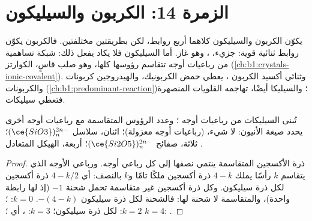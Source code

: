 \section{الزمرة 14: الكربون والسيليكون}

يكوّن الكربون والسيليكون كلاهما أربع روابط، لكن بطريقتين مختلفتين. فالكربون يكوّن
روابط ثنائية قوية:  جزيء، ، وهو غاز. أما السيليكون
فلا يكاد يفعل ذلك:  شبكة تساهمية من رباعيات أوجه 
تتقاسم رؤوسها كلها، وهو صلب قاسٍ، الكوارتز (\cref{ch:b1:crystals-ionic-covalent}).
وثنائي أكسيد الكربون ، يعطي حمض الكربونيك، والهيدروجين كربونات
والكربونات (\cref{ch:b1:predominant-reaction})؛ والسيليكا  أيضًا، تهاجمه القلويات المنصهرة فتعطي سيليكات.

\begin{proposition}\label{prop:b1:p-block-13-15:silicate-units}
تُبنى السيليكات من رباعيات أوجه ؛ وعدد الرؤوس المتقاسمة
مع رباعيات أوجه أخرى يحدد صيغة الأنيون: لا شيء، 
(رباعيات أوجه معزولة)؛ اثنان، سلاسل $(\ce{SiO3})_n^{2n-}$؛ ثلاثة، صفائح
$(\ce{Si2O5})_n^{2n-}$؛ أربعة، الهيكل المتعادل .
\end{proposition}

\begin{proof}
ذرة الأكسجين المتقاسمة ينتمي نصفها إلى كل رباعي أوجه. ورباعي الأوجه الذي يتقاسم
$k$ رأسًا يملك $4 - k$ ذرة أكسجين ملكًا تامًا و$k$ بالنصف: أي $4 -
k/2$ ذرة أكسجين لكل ذرة سيليكون. وكل ذرة أكسجين غير متقاسمة تحمل شحنة $-1$ (إذ
لها رابطة واحدة)، والمتقاسمة لا شحنة لها: فالشحنة لكل ذرة سيليكون
$-(4 - k)$. $k = 0$: ؛ $k = 2$:  لكل ذرة سيليكون؛
$k = 3$: ، أي ؛ $k = 4$: .
\end{proof}

